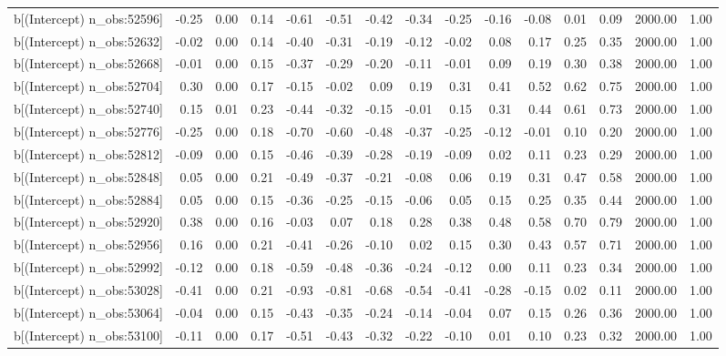 \begin{table}[ht]
\begin{tabular}{rrrrrrrrrrrrrrr}
  b[(Intercept) n\_obs:52596] & -0.25 & 0.00 & 0.14 & -0.61 & -0.51 & -0.42 & -0.34 & -0.25 & -0.16 & -0.08 & 0.01 & 0.09 & 2000.00 & 1.00 \\ 
  b[(Intercept) n\_obs:52632] & -0.02 & 0.00 & 0.14 & -0.40 & -0.31 & -0.19 & -0.12 & -0.02 & 0.08 & 0.17 & 0.25 & 0.35 & 2000.00 & 1.00 \\ 
  b[(Intercept) n\_obs:52668] & -0.01 & 0.00 & 0.15 & -0.37 & -0.29 & -0.20 & -0.11 & -0.01 & 0.09 & 0.19 & 0.30 & 0.38 & 2000.00 & 1.00 \\ 
  b[(Intercept) n\_obs:52704] & 0.30 & 0.00 & 0.17 & -0.15 & -0.02 & 0.09 & 0.19 & 0.31 & 0.41 & 0.52 & 0.62 & 0.75 & 2000.00 & 1.00 \\ 
  b[(Intercept) n\_obs:52740] & 0.15 & 0.01 & 0.23 & -0.44 & -0.32 & -0.15 & -0.01 & 0.15 & 0.31 & 0.44 & 0.61 & 0.73 & 2000.00 & 1.00 \\ 
  b[(Intercept) n\_obs:52776] & -0.25 & 0.00 & 0.18 & -0.70 & -0.60 & -0.48 & -0.37 & -0.25 & -0.12 & -0.01 & 0.10 & 0.20 & 2000.00 & 1.00 \\ 
  b[(Intercept) n\_obs:52812] & -0.09 & 0.00 & 0.15 & -0.46 & -0.39 & -0.28 & -0.19 & -0.09 & 0.02 & 0.11 & 0.23 & 0.29 & 2000.00 & 1.00 \\ 
  b[(Intercept) n\_obs:52848] & 0.05 & 0.00 & 0.21 & -0.49 & -0.37 & -0.21 & -0.08 & 0.06 & 0.19 & 0.31 & 0.47 & 0.58 & 2000.00 & 1.00 \\ 
  b[(Intercept) n\_obs:52884] & 0.05 & 0.00 & 0.15 & -0.36 & -0.25 & -0.15 & -0.06 & 0.05 & 0.15 & 0.25 & 0.35 & 0.44 & 2000.00 & 1.00 \\ 
  b[(Intercept) n\_obs:52920] & 0.38 & 0.00 & 0.16 & -0.03 & 0.07 & 0.18 & 0.28 & 0.38 & 0.48 & 0.58 & 0.70 & 0.79 & 2000.00 & 1.00 \\ 
  b[(Intercept) n\_obs:52956] & 0.16 & 0.00 & 0.21 & -0.41 & -0.26 & -0.10 & 0.02 & 0.15 & 0.30 & 0.43 & 0.57 & 0.71 & 2000.00 & 1.00 \\ 
  b[(Intercept) n\_obs:52992] & -0.12 & 0.00 & 0.18 & -0.59 & -0.48 & -0.36 & -0.24 & -0.12 & 0.00 & 0.11 & 0.23 & 0.34 & 2000.00 & 1.00 \\ 
  b[(Intercept) n\_obs:53028] & -0.41 & 0.00 & 0.21 & -0.93 & -0.81 & -0.68 & -0.54 & -0.41 & -0.28 & -0.15 & 0.02 & 0.11 & 2000.00 & 1.00 \\ 
  b[(Intercept) n\_obs:53064] & -0.04 & 0.00 & 0.15 & -0.43 & -0.35 & -0.24 & -0.14 & -0.04 & 0.07 & 0.15 & 0.26 & 0.36 & 2000.00 & 1.00 \\ 
  b[(Intercept) n\_obs:53100] & -0.11 & 0.00 & 0.17 & -0.51 & -0.43 & -0.32 & -0.22 & -0.10 & 0.01 & 0.10 & 0.23 & 0.32 & 2000.00 & 1.00 \\ 

\end{tabular}
\end{table}
